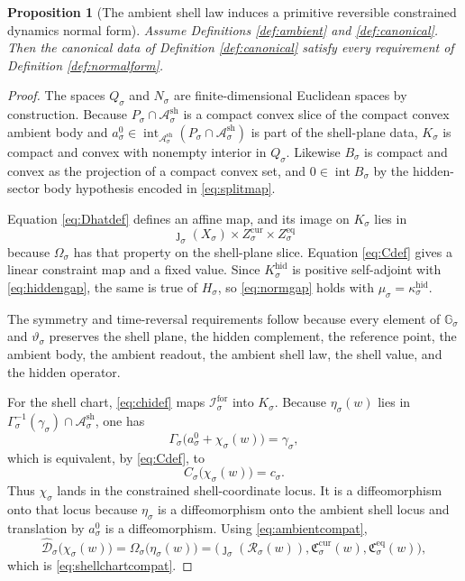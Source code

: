 \documentclass[11pt]{article}
\newcommand{\ForSpace}[1]{\mathcal I_{#1}^{\mathrm{for}}}
\newcommand{\Reduction}[1]{\mathcal R_{#1}}
\newcommand{\CurrentCarrier}[1]{\mathfrak C_{#1}^{\mathrm{cur}}}
\newcommand{\EqCarrier}[1]{\mathfrak C_{#1}^{\mathrm{eq}}}
\newcommand{\CoordSpace}[1]{Q_{#1}}
\newcommand{\CoordBody}[1]{K_{#1}}
\newcommand{\NormalSpace}[1]{N_{#1}}
\newcommand{\NormalBody}[1]{B_{#1}}
\newcommand{\AffineData}[1]{\widehat{\mathcal D}_{#1}}
\newcommand{\ConstraintMap}[1]{C_{#1}}
\newcommand{\ConstraintValue}[1]{c_{#1}}
\newcommand{\NormalOperator}[1]{H_{#1}}
\newcommand{\ShellChart}[1]{\chi_{#1}}
\newcommand{\AmbientBody}[1]{P_{#1}}
\newcommand{\AmbientRead}[1]{\Omega_{#1}}
\newcommand{\AmbientShellLaw}[1]{\Gamma_{#1}}
\newcommand{\AmbientValue}[1]{\gamma_{#1}}
\newcommand{\AmbientSym}[1]{\mathbb G_{#1}}
\newcommand{\AmbientTime}[1]{\vartheta_{#1}}
\newcommand{\ShellAffine}[1]{\mathcal A_{#1}^{\mathrm{sh}}}
\newcommand{\HiddenOperator}[1]{K_{#1}^{\mathrm{hid}}}
\newcommand{\AmbientEmbed}[1]{\eta_{#1}}
\newcommand{\AmbientRef}[1]{a_{#1}^{0}}
\newtheorem{proposition}{Proposition}
\begin{document}
\begin{proposition}[The ambient shell law induces a primitive reversible constrained dynamics normal form]
\label{prop:derive}
Assume Definitions \ref{def:ambient} and \ref{def:canonical}. Then the canonical data of Definition \ref{def:canonical} satisfy every requirement of Definition \ref{def:normalform}.
\end{proposition}

\begin{proof}
The spaces \(\CoordSpace{\sigma}\) and \(\NormalSpace{\sigma}\) are finite-dimensional Euclidean spaces by construction. Because \(\AmbientBody{\sigma}\cap \ShellAffine{\sigma}\) is a compact convex slice of the compact convex ambient body and \(\AmbientRef{\sigma}\in\operatorname{int}_{\ShellAffine{\sigma}}(\AmbientBody{\sigma}\cap\ShellAffine{\sigma})\) is part of the shell-plane data, \(\CoordBody{\sigma}\) is compact and convex with nonempty interior in \(\CoordSpace{\sigma}\). Likewise \(\NormalBody{\sigma}\) is compact and convex as the projection of a compact convex set, and \(0\in\operatorname{int}\NormalBody{\sigma}\) by the hidden-sector body hypothesis encoded in \eqref{eq:splitmap}.

Equation \eqref{eq:Dhatdef} defines an affine map, and its image on \(\CoordBody{\sigma}\) lies in
\[
\jmath_{\sigma}(X_{\sigma})\times Z_{\sigma}^{\mathrm{cur}}\times Z_{\sigma}^{\mathrm{eq}}
\]
because \(\AmbientRead{\sigma}\) has that property on the shell-plane slice. Equation \eqref{eq:Cdef} gives a linear constraint map and a fixed value. Since \(\HiddenOperator{\sigma}\) is positive self-adjoint with \eqref{eq:hiddengap}, the same is true of \(\NormalOperator{\sigma}\), so \eqref{eq:normgap} holds with \(\mu_{\sigma}=\kappa_{\sigma}^{\mathrm{hid}}\).

The symmetry and time-reversal requirements follow because every element of \(\AmbientSym{\sigma}\) and \(\AmbientTime{\sigma}\) preserves the shell plane, the hidden complement, the reference point, the ambient body, the ambient readout, the ambient shell law, the shell value, and the hidden operator.

For the shell chart, \eqref{eq:chidef} maps \(\ForSpace{\sigma}\) into \(\CoordBody{\sigma}\). Because \(\AmbientEmbed{\sigma}(w)\) lies in \(\AmbientShellLaw{\sigma}^{-1}(\AmbientValue{\sigma})\cap \ShellAffine{\sigma}\), one has
\[
\AmbientShellLaw{\sigma}\bigl(\AmbientRef{\sigma}+\ShellChart{\sigma}(w)\bigr)
=
\AmbientValue{\sigma},
\]
which is equivalent, by \eqref{eq:Cdef}, to
\[
\ConstraintMap{\sigma}\bigl(\ShellChart{\sigma}(w)\bigr)
=
\ConstraintValue{\sigma}.
\]
Thus \(\ShellChart{\sigma}\) lands in the constrained shell-coordinate locus. It is a diffeomorphism onto that locus because \(\AmbientEmbed{\sigma}\) is a diffeomorphism onto the ambient shell locus and translation by \(\AmbientRef{\sigma}\) is a diffeomorphism. Using \eqref{eq:ambientcompat},
\[
\AffineData{\sigma}\bigl(\ShellChart{\sigma}(w)\bigr)
=
\AmbientRead{\sigma}\bigl(\AmbientEmbed{\sigma}(w)\bigr)
=
\bigl(
\jmath_{\sigma}(\Reduction{\sigma}(w)),
\CurrentCarrier{\sigma}(w),
\EqCarrier{\sigma}(w)
\bigr),
\]
which is \eqref{eq:shellchartcompat}.


\end{proof}
\end{document}
